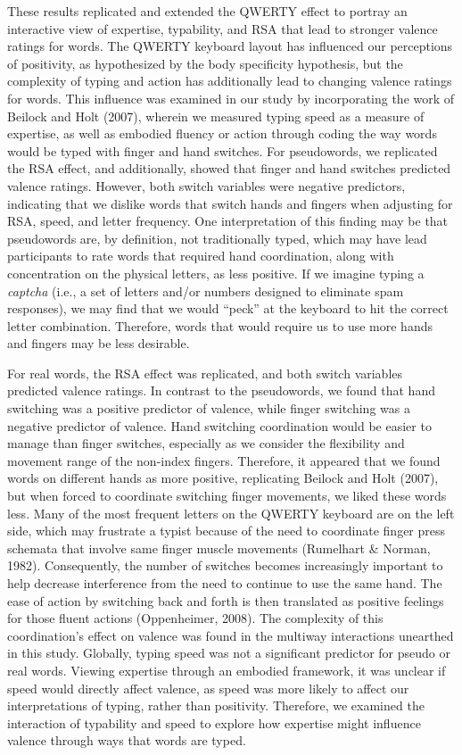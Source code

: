 \documentclass[english,man]{apa6}
\theoremstyle{definition}
\theoremstyle{definition}
\theoremstyle{definition}
\theoremstyle{remark}
\begin{document}
These results replicated and extended the QWERTY effect to portray an
interactive view of expertise, typability, and RSA that lead to stronger
valence ratings for words. The QWERTY keyboard layout has influenced our
perceptions of positivity, as hypothesized by the body specificity
hypothesis, but the complexity of typing and action has additionally
lead to changing valence ratings for words. This influence was examined
in our study by incorporating the work of Beilock and Holt (2007),
wherein we measured typing speed as a measure of expertise, as well as
embodied fluency or action through coding the way words would be typed
with finger and hand switches. For pseudowords, we replicated the RSA
effect, and additionally, showed that finger and hand switches predicted
valence ratings. However, both switch variables were negative
predictors, indicating that we dislike words that switch hands and
fingers when adjusting for RSA, speed, and letter frequency. One
interpretation of this finding may be that pseudowords are, by
definition, not traditionally typed, which may have lead participants to
rate words that required hand coordination, along with concentration on
the physical letters, as less positive. If we imagine typing a
\emph{captcha} (i.e., a set of letters and/or numbers designed to
eliminate spam responses), we may find that we would \enquote{peck} at
the keyboard to hit the correct letter combination. Therefore, words
that would require us to use more hands and fingers may be less
desirable.

For real words, the RSA effect was replicated, and both switch variables
predicted valence ratings. In contrast to the pseudowords, we found that
hand switching was a positive predictor of valence, while finger
switching was a negative predictor of valence. Hand switching
coordination would be easier to manage than finger switches, especially
as we consider the flexibility and movement range of the non-index
fingers. Therefore, it appeared that we found words on different hands
as more positive, replicating Beilock and Holt (2007), but when forced
to coordinate switching finger movements, we liked these words less.
Many of the most frequent letters on the QWERTY keyboard are on the left
side, which may frustrate a typist because of the need to coordinate
finger press schemata that involve same finger muscle movements
(Rumelhart \& Norman, 1982). Consequently, the number of switches
becomes increasingly important to help decrease interference from the
need to continue to use the same hand. The ease of action by switching
back and forth is then translated as positive feelings for those fluent
actions (Oppenheimer, 2008). The complexity of this coordination's
effect on valence was found in the multiway interactions unearthed in
this study. Globally, typing speed was not a significant predictor for
pseudo or real words. Viewing expertise through an embodied framework,
it was unclear if speed would directly affect valence, as speed was more
likely to affect our interpretations of typing, rather than positivity.
Therefore, we examined the interaction of typability and speed to
explore how expertise might influence valence through ways that words
are typed.
\end{document}
